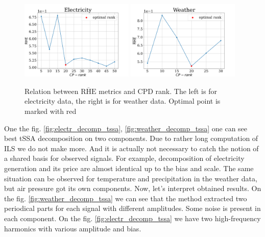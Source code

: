 \documentclass[referee, pdflatex]{sn-jnl}
\theoremstyle{definition}
\theoremstyle{plain}
\begin{document}
	\begin{figure}[h]
		\centering
		\includegraphics[width=0.48\textwidth, keepaspectratio]{../../experiments/electricity/tssa/figs/decomposition/RHE_mean.png}
		\includegraphics[width=0.48\textwidth, keepaspectratio]{../../experiments/weather/tssa/figs/decomposition/RHE_mean.png}
		\caption{Relation between $ \overline{\text{RHE}} $ metrics and CPD rank. The left is for electricity data, the right is for weather data. Optimal point is marked with red}\label{fig:decomp_rhe_rank}
	\end{figure}
	
	One the fig. \ref{fig:electr_decomp_tssa}, \ref{fig:weather_decomp_tssa} one can see best tSSA decomposition on two components. Due to rather long computation of ILS we do not make more. And it is actually not necessary to catch the notion of a shared basis for observed signals. For example, decomposition of electricity generation and its price are almost identical up to the bias and scale. The same situation can be observed for temperature and precipitation in the weather data, but air pressure got its own components. Now, let's interpret obtained results. On the fig. \ref{fig:weather_decomp_tssa} we can see that the method extracted two periodical parts for each signal with different amplitudes. Some noise is present in each component. On the fig. \ref{fig:electr_decomp_tssa} we have two high-frequency harmonics with various amplitude and bias.	
	
\end{document}
